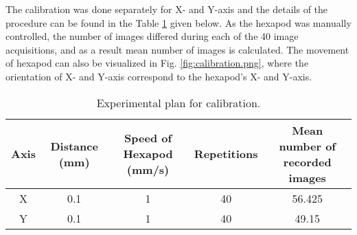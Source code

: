         \noindent The calibration was done separately for X- and Y-axis and the details of the procedure can be found in the Table \ref{table:calibration_plan} given below. As the hexapod was manually controlled, the number of images differed during each of the 40 image acquisitions, and as a result mean number of images is calculated. The movement of hexapod can also be visualized in Fig. \ref{fig:calibration.png}, where the orientation of X- and Y-axis correspond to the hexapod's X- and Y-axis.

        \begin{table}[ht]
            \centering
            \footnotesize
            {
            \begin{tabular}{ccccc}
                \toprule
                \textbf{Axis} & \textbf{Distance (mm)} & \textbf{Speed of Hexapod (mm/s)} & \textbf{Repetitions} & \textbf{Mean number of recorded images} \\
                \midrule
                X & 0.1 & 1 & 40 & 56.425 \\
                Y & 0.1 & 1 & 40 & 49.15 \\
                \bottomrule
            \end{tabular}
            }
            \caption{Experimental plan for calibration.}
            \label{table:calibration_plan}
        \end{table}
    


